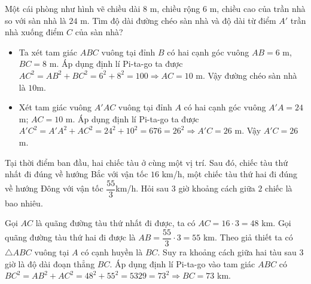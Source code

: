 \begin{vd}
\immini
{Một cái phòng như hình vẽ chiều dài $ 8 $ m, chiều rộng $ 6 $ m, chiều cao của trần nhà so với sàn nhà là $ 24 $ m. Tìm độ dài 	đường chéo sàn nhà và độ dài từ điểm $ A' $ trần nhà xuống điểm $ C $ của sàn nhà?}
{
}
\loigiai
{
\begin{itemize}
	\item Ta xét tam giác $ ABC $ vuông tại đỉnh $ B $ có hai cạnh góc vuông $ AB=6 $ m, $ BC=8 $ m. Áp dụng định lí Pi-ta-go ta được $ AC^2=AB^2+BC^2=6^2+8^2=100 \Rightarrow AC= 10$ m. Vậy đường chéo sàn nhà là $ 10 $m.
	\item Xét tam giác vuông $ A'AC $ vuông tại đỉnh $ A $ có hai cạnh góc vuông $ A'A=24 $m; $ AC=10 $ m. Áp dụng định lí Pi-ta-go ta được $ A'C^2=A'A^2+AC^2=24^2+10^2=676=26^2 \Rightarrow A'C= 26$ m. Vậy $ A'C=26 $m.
\end{itemize}
}
\end{vd}
\begin{vd}%
Tại thời điểm ban đầu, hai chiếc tàu ở cùng một vị trí. Sau đó, chiếc tàu thứ nhất đi đúng về hướng Bắc với vận tốc $16$ km/h, một chiếc tàu thứ hai đi đúng về hướng Đông với vận tốc $ \dfrac{55}{3} $km/h. Hỏi sau $3$ giờ khoảng cách giữa $ 2 $ chiếc là bao nhiêu.
	\loigiai
	{
\immini
{
Gọi $ AC $ là quãng đường tàu thứ nhất đi được, ta có $ AC=16\cdot 3=48 $ km. Gọi quãng đường tàu thứ hai đi được là $ AB=\dfrac{55}{3} \cdot 3 =55$ km.
Theo giả thiết ta có $ \triangle ABC $ vuông tại $ A $ có cạnh huyền là $ BC $. Suy ra khoảng cách giữa hai tàu sau $ 3 $ giờ là độ dài đoạn thẳng $ BC $.
Áp dụng định lí Pi-ta-go vào tam giác $ ABC $ có $ BC^2=AB^2+AC^2=48^2+55^2=5329=73^2 \Rightarrow BC=73 $ km.
}
{
}	
	}
\end{vd}
